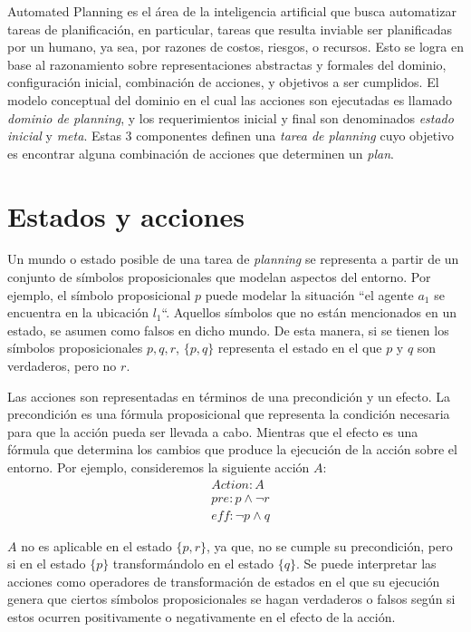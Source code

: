 Automated Planning es el área de la inteligencia artificial que busca
automatizar tareas de planificación, en particular, tareas que resulta inviable
ser planificadas por un humano, ya sea, por razones de costos, riesgos, o
recursos. Esto se logra en base al razonamiento sobre representaciones
abstractas y formales del dominio, configuración inicial, combinación de
acciones, y objetivos a ser cumplidos. El modelo conceptual del dominio en el
cual las acciones son ejecutadas es llamado \emph{dominio de planning}, y los
requerimientos inicial y final son denominados \emph{estado inicial} y
\emph{meta}. Estas 3 componentes definen una \emph{tarea de planning} cuyo
objetivo es encontrar alguna combinación de acciones que determinen un
\emph{plan}.

\section{Estados y acciones}

Un mundo o estado  posible de una tarea de \emph{planning} se representa a
partir de un conjunto de símbolos proposicionales que modelan aspectos del
entorno. Por ejemplo, el símbolo proposicional $p$ puede modelar la situación
``el agente $a_1$ se encuentra en la ubicación $l_1$``. Aquellos símbolos  que
no están mencionados en un estado, se asumen como falsos en dicho mundo. De esta
manera, si se tienen los símbolos proposicionales $p,q,r$, $\{p, q\}$ representa
el estado en el que $p$ y $q$ son verdaderos, pero no $r$.

Las acciones son representadas en términos de una precondición y un efecto. La
precondición es una fórmula proposicional que representa la condición necesaria
para que la acción pueda ser llevada a cabo. Mientras que el efecto es una
fórmula que determina los cambios que produce la ejecución de la acción sobre el
entorno. Por ejemplo, consideremos la siguiente acción $A$:
\begin{align*}
    & Action : A \\
    & pre : p \land \neg r \\
    & \mathit{eff} : \neg p \land q
\end{align*}

$A$ no es aplicable en el estado $\{p, r\}$, ya que, no se cumple su
precondición, pero si en el estado $\{p\}$ transformándolo en el estado $\{q\}$.
Se puede interpretar las acciones como operadores de transformación de estados
en el que su ejecución genera que ciertos símbolos proposicionales se hagan
verdaderos o falsos según si estos ocurren positivamente o negativamente en el
efecto de la acción.


